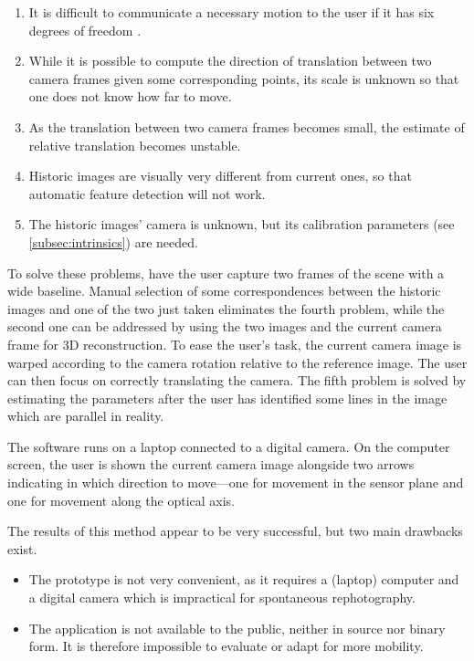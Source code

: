 \begin{enumerate}
   \item It is difficult to communicate a necessary motion to the user if it has
      six degrees of freedom .
   \item While it is possible to compute the direction of translation between
      two camera frames given some corresponding points, its scale is unknown so
      that one does not know how far to move.
   \item As the translation between two camera frames becomes small, the
      estimate of relative translation becomes unstable.
   \item Historic images are visually very different from current ones, so that
      automatic feature detection will not work.
   \item The historic images' camera is unknown, but its calibration parameters
      (see \autoref{subsec:intrinsics}) are needed.
\end{enumerate}

To solve these problems, \citet{bae2010} have the user capture two frames of the
scene with a wide baseline. Manual selection of some correspondences between the
historic images and one of the two just taken eliminates the fourth problem,
while the second one can be addressed by using the two images and the current
camera frame for 3D reconstruction. To ease the user's task, the current camera
image is warped according to the camera rotation relative to the reference image.
The user can then
focus on correctly translating the camera. The fifth problem is solved by
estimating the parameters after the user has identified some lines in the image
which are parallel in reality.

The software runs on a laptop connected to a digital camera. On the computer
screen, the user is shown the current camera image alongside two arrows
indicating in which direction to move---one for movement in the sensor plane and
one for movement along the optical axis.

The results of this method appear to be very successful, but two main drawbacks
exist.

\begin{itemize}
   \item The prototype is not very convenient, as it requires a (laptop)
      computer and a digital camera which is impractical for
      spontaneous rephotography.
   \item The application is not available to the public, neither in source nor
      binary form. It is therefore impossible to evaluate or adapt for more mobility.
\end{itemize}

